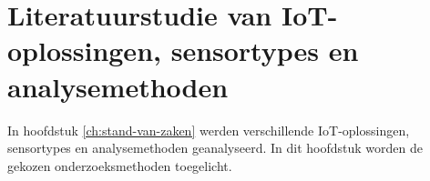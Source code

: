 






\section{Literatuurstudie van IoT-oplossingen, sensortypes en analysemethoden}
In hoofdstuk \ref{ch:stand-van-zaken} werden verschillende IoT-oplossingen, sensortypes en analysemethoden geanalyseerd. In dit hoofdstuk worden de gekozen onderzoeksmethoden toegelicht.

